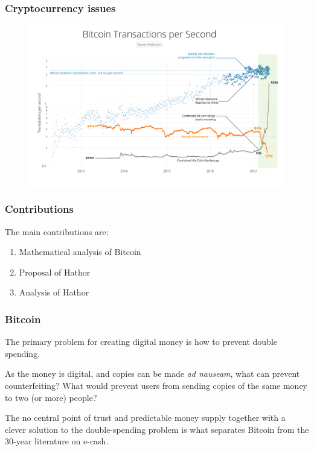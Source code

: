 \documentclass{beamer}
\begin{document}
\begin{frame}
\frametitle{Cryptocurrency issues}

\begin{figure}
\includegraphics[width=\textwidth]{./images-defense/bitcoin-congestion.png}
\end{figure}

\end{frame}


\begin{frame}
\frametitle{Contributions}

The main contributions are:
\begin{enumerate}[i]
\item Mathematical analysis of Bitcoin
\item Proposal of Hathor
\item Analysis of Hathor
\end{enumerate}
\end{frame}


\begin{frame}
\frametitle{Bitcoin}

The primary problem for creating digital money is how to prevent double spending.

As the money is digital, and copies can be made \emph{ad nauseam}, what can prevent counterfeiting? What would prevent users from sending copies of the same money to two (or more) people?

The no central point of trust and predictable money supply together with a clever solution to the double-spending problem is what separates Bitcoin from the 30-year literature on e-cash.

\end{frame}
\end{document}
